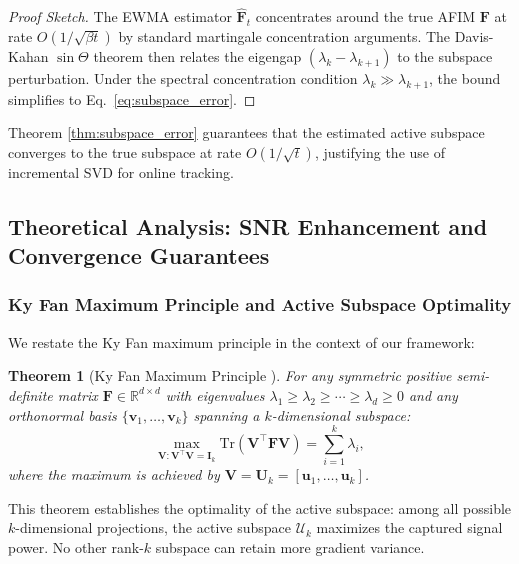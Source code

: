 \documentclass[preprint,12pt]{elsarticle}
\newtheorem{theorem}{Theorem}[section]
\begin{document}
\begin{proof}[Proof Sketch]
The EWMA estimator $\hat{\mathbf{F}}_t$ concentrates around the true AFIM $\mathbf{F}$ at rate $O(1/\sqrt{\beta t})$ by standard martingale concentration arguments. The Davis-Kahan $\sin \Theta$ theorem \cite{davis1970rotation} then relates the eigengap $(\lambda_k - \lambda_{k+1})$ to the subspace perturbation. Under the spectral concentration condition $\lambda_k \gg \lambda_{k+1}$, the bound simplifies to Eq.~\eqref{eq:subspace_error}.
\end{proof}

Theorem \ref{thm:subspace_error} guarantees that the estimated active subspace converges to the true subspace at rate $O(1/\sqrt{t})$, justifying the use of incremental SVD for online tracking.

\subsection{Theoretical Analysis: SNR Enhancement and Convergence Guarantees}
\label{sec:theory}

\subsubsection{Ky Fan Maximum Principle and Active Subspace Optimality}
\label{sec:ky_fan}

We restate the Ky Fan maximum principle \cite{fan1949theorem} in the context of our framework:

\begin{theorem}[Ky Fan Maximum Principle \cite{fan1949theorem}]
\label{thm:ky_fan}
For any symmetric positive semi-definite matrix $\mathbf{F} \in \mathbb{R}^{d \times d}$ with eigenvalues $\lambda_1 \geq \lambda_2 \geq \cdots \geq \lambda_d \geq 0$ and any orthonormal basis $\{\mathbf{v}_1, \ldots, \mathbf{v}_k\}$ spanning a $k$-dimensional subspace:
\begin{equation}
\label{eq:ky_fan}
\max_{\mathbf{V} : \mathbf{V}^\top \mathbf{V} = \mathbf{I}_k} \text{Tr}(\mathbf{V}^\top \mathbf{F} \mathbf{V}) = \sum_{i=1}^{k} \lambda_i,
\end{equation}
where the maximum is achieved by $\mathbf{V} = \mathbf{U}_k = [\mathbf{u}_1, \ldots, \mathbf{u}_k]$.
\end{theorem}

This theorem establishes the optimality of the active subspace: among all possible $k$-dimensional projections, the active subspace $\mathcal{U}_k$ maximizes the captured signal power. No other rank-$k$ subspace can retain more gradient variance.
\end{document}
